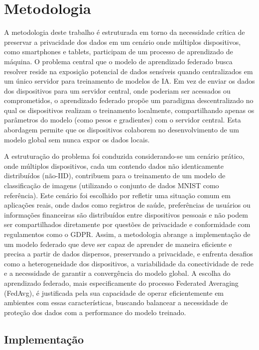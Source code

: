 \chapter[Metodologia]{Metodologia}
\label{chap:metodologia}

A metodologia deste trabalho é estruturada em torno da necessidade crítica de preservar a privacidade dos dados em um cenário onde múltiplos dispositivos, como smartphones e tablets, participam de um processo de aprendizado de máquina. O problema central que o modelo de aprendizado federado busca resolver reside na exposição potencial de dados sensíveis quando centralizados em um único servidor para treinamento de modelos de IA. Em vez de enviar os dados dos dispositivos para um servidor central, onde poderiam ser acessados ou comprometidos, o aprendizado federado propõe um paradigma descentralizado no qual os dispositivos realizam o treinamento localmente, compartilhando apenas os parâmetros do modelo (como pesos e gradientes) com o servidor central. Esta abordagem permite que os dispositivos colaborem no desenvolvimento de um modelo global sem nunca expor os dados locais. 

A estruturação do problema foi conduzida considerando-se um cenário prático, onde múltiplos dispositivos, cada um contendo dados não identicamente distribuídos (não-IID), contribuem para o treinamento de um modelo de classificação de imagens (utilizando o conjunto de dados MNIST como referência). Este cenário foi escolhido por refletir uma situação comum em aplicações reais, onde dados como registros de saúde, preferências de usuários ou informações financeiras são distribuídos entre dispositivos pessoais e não podem ser compartilhados diretamente por questões de privacidade e conformidade com regulamentos como o GDPR. Assim, a metodologia abrange a implementação de um modelo federado que deve ser capaz de aprender de maneira eficiente e precisa a partir de dados dispersos, preservando a privacidade, e enfrenta desafios como a heterogeneidade dos dispositivos, a variabilidade da conectividade de rede e a necessidade de garantir a convergência do modelo global. A escolha do aprendizado federado, mais especificamente do processo Federated Averaging (FedAvg), é justificada pela sua capacidade de operar eficientemente em ambientes com essas características, buscando balancear a necessidade de proteção dos dados com a performance do modelo treinado.

\section{Implementação}
\label{sec:implementacao}

